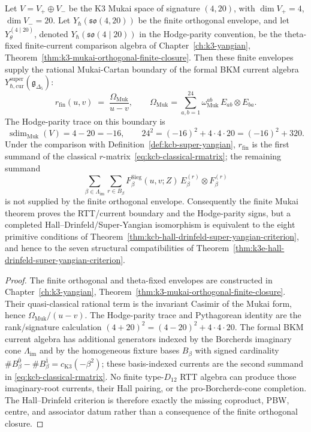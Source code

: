 \begin{proposition}
\label{prop:kcb-finite-mukai-orthogonal-boundary}
Let $V=V_+\oplus V_-$ be the K3 Mukai space of signature
$(4,20)$, with $\dim V_+=4$, $\dim V_-=20$. Let
\(Y_\hbar(\mathfrak{so}(4,20))\) be the finite orthogonal envelope, and
let \(Y_\theta^{(4\mid20)}\), denoted
\(Y_\hbar(\mathfrak{so}(4\mid20))\) in the Hodge-parity convention, be
the theta-fixed finite-current comparison algebra of
Chapter~\ref{ch:k3-yangian},
Theorem~\ref{thm:k3-mukai-orthogonal-finite-closure}. Then these
finite envelopes supply the rational Mukai-Cartan boundary of
the formal BKM current algebra
$Y_{\hbar,\mathrm{cur}}^{\mathrm{super}}(\mathfrak{g}_{\Delta_5})$:
\[
 r_{\mathrm{fin}}(u,v)
 \;=\;
 \frac{\Omega_{\mathrm{Muk}}}{u-v},
 \qquad
 \Omega_{\mathrm{Muk}}
 =
 \sum_{a,b=1}^{24}
 \omega_{\mathrm{Muk}}^{ab}\,E_{ab}\otimes E_{ba}.
\]
The Hodge-parity trace on this boundary is
\[
 \operatorname{sdim}_{\mathrm{Muk}}(V)=4-20=-16,
 \qquad
 24^2=(-16)^2+4\cdot4\cdot20=(-16)^2+320.
\]
Under the comparison with Definition~\ref{def:kcb-super-yangian},
$r_{\mathrm{fin}}$ is the first summand of the classical
$r$-matrix~\eqref{eq:kcb-classical-rmatrix}; the remaining summand
\[
 \sum_{\beta\in\Lambda_{\mathrm{im}}}\sum_{r\in B_\beta}
 F^{\mathrm{Sieg}}_\beta(u,v;Z)\,
 E_\beta^{(r)}\otimes F_\beta^{(r)}
\]
is not supplied by the finite orthogonal envelope. Consequently the
finite Mukai theorem proves the RTT/current boundary and the
Hodge-parity signs, but a completed Hall--Drinfeld/Super-Yangian
isomorphism is equivalent to the eight primitive conditions of
Theorem~\ref{thm:kcb-hall-drinfeld-super-yangian-criterion}, and hence
to the seven structural compatibilities of
Theorem~\ref{thm:k3e-hall-drinfeld-super-yangian-criterion}.
\end{proposition}

\begin{proof}
The finite orthogonal and theta-fixed envelopes are constructed in
Chapter~\ref{ch:k3-yangian},
Theorem~\ref{thm:k3-mukai-orthogonal-finite-closure}. Their
quasi-classical rational term is the invariant Casimir of the Mukai
form, hence $\Omega_{\mathrm{Muk}}/(u-v)$. The Hodge-parity trace and
Pythagorean identity are the rank/signature calculation
\((4+20)^2=(4-20)^2+4\cdot4\cdot20\). The formal BKM current algebra
has additional generators indexed by the Borcherds imaginary cone
$\Lambda_{\mathrm{im}}$ and by the homogeneous fixture bases $B_\beta$
with signed cardinality
$\#B_\beta^{\overline{0}}-\#B_\beta^{\overline{1}}
=c_{\mathrm{K3}}(-\beta^2)$; these basis-indexed currents are the
second summand in
\eqref{eq:kcb-classical-rmatrix}. No finite type-$D_{12}$ RTT algebra
can produce those imaginary-root currents, their Hall pairing, or the
pro-Borcherds-cone completion. The Hall--Drinfeld criterion is
therefore exactly the missing coproduct, PBW, centre, and associator
datum rather than a consequence of the finite orthogonal closure.
\end{proof}

